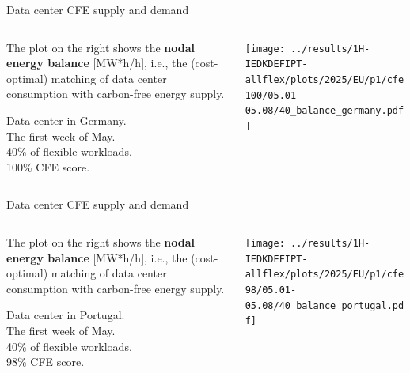 \begin{frame}{Data center CFE supply and demand}
  \label{nb3}

  {\footnotesize
  
  \begin{columns}[T]
    \begin{column}{3.5cm}
      \vspace{0.3cm}
      The plot on the right shows the {\bf nodal energy balance} [MW*h/h], i.e., the (cost-optimal) matching of data center consumption with carbon-free energy supply.

      \vspace{0.2cm}
      Data center in Germany. \\
      The first week of May. \\
      40\% of flexible workloads.\\
      100\% CFE score.\\
    \end{column}
  
    \begin{column}{11cm}
      \texttt{[image: ../results/1H-IEDKDEFIPT-allflex/plots/2025/EU/p1/cfe100/05.01-05.08/40\_balance\_germany.pdf]}
    \end{column}
    \end{columns}
    } 

\end{frame}


\begin{frame}{Data center CFE supply and demand}
  \label{nbtemp-40-PT}

  {\footnotesize
  
  \begin{columns}[T]
    \begin{column}{3.5cm}
      \vspace{0.3cm}
      The plot on the right shows the {\bf nodal energy balance} [MW*h/h], i.e., the (cost-optimal) matching of data center consumption with carbon-free energy supply.

      \vspace{0.2cm}
      Data center in Portugal. \\
      The first week of May. \\
      40\% of flexible workloads.\\
      98\% CFE score.\\

    \end{column}
  
    \begin{column}{11cm}
      \texttt{[image: ../results/1H-IEDKDEFIPT-allflex/plots/2025/EU/p1/cfe98/05.01-05.08/40\_balance\_portugal.pdf]}
    \end{column}
    \end{columns}
    } 

\end{frame}


